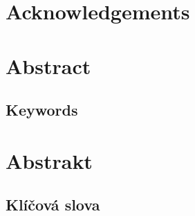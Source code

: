 \openright
\vspace*{\fill}
\section*{Acknowledgements}
\noindent
\Podekovani
\vspace{1cm}


\openright
\section*{Abstract}
\noindent
\AbstraktEN
\subsection*{Keywords}
\noindent
\KlicovaSlovaEN

\bigskip\bigskip\bigskip
\section*{Abstrakt}
\noindent
\Abstrakt
\subsection*{Klíčová slova}
\noindent
\KlicovaSlova

\openright
{}
